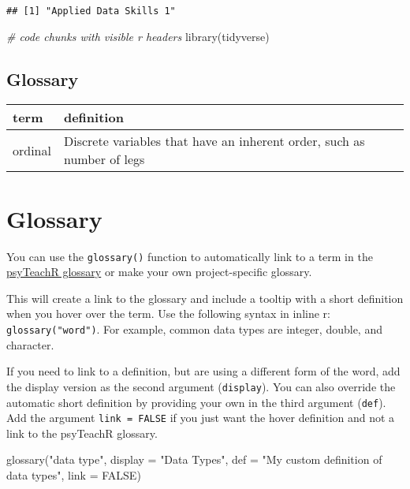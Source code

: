 \documentclass[
  oneside]{book}
\newenvironment{Shaded}{\begin{snugshade}}{\end{snugshade}}
\newcommand{\AttributeTok}[1]{\textcolor[rgb]{0.77,0.63,0.00}{#1}}
\newcommand{\CommentTok}[1]{\textcolor[rgb]{0.56,0.35,0.01}{\textit{#1}}}
\newcommand{\ConstantTok}[1]{\textcolor[rgb]{0.00,0.00,0.00}{#1}}
\newcommand{\FunctionTok}[1]{\textcolor[rgb]{0.00,0.00,0.00}{#1}}
\newcommand{\NormalTok}[1]{#1}
\newcommand{\StringTok}[1]{\textcolor[rgb]{0.31,0.60,0.02}{#1}}
\begin{document}
\begin{verbatim}
## [1] "Applied Data Skills 1"
\end{verbatim}

\begin{Shaded}
\begin{Highlighting}[]
\CommentTok{\# code chunks with visible r headers}
\FunctionTok{library}\NormalTok{(tidyverse)}
\end{Highlighting}
\end{Shaded}

\hypertarget{glossary}{%
\section{Glossary}\label{glossary}}

\begin{tabular}{l|l}
\hline
term & definition\\
\hline
ordinal & Discrete variables that have an inherent order, such as number of legs\\
\hline
\end{tabular}

\hypertarget{glossary-1}{%
\chapter{Glossary}\label{glossary-1}}

You can use the \texttt{glossary()} function to automatically link to a term in the \href{https://psyteachr.github.io/glossary/}{psyTeachR glossary} or make your own project-specific glossary.

This will create a link to the glossary and include a tooltip with a short definition when you hover over the term. Use the following syntax in inline r: \texttt{glossary("word")}. For example, common data types are integer, double, and character.

If you need to link to a definition, but are using a different form of the word, add the display version as the second argument (\texttt{display}). You can also override the automatic short definition by providing your own in the third argument (\texttt{def}). Add the argument \texttt{link\ =\ FALSE} if you just want the hover definition and not a link to the psyTeachR glossary.

\begin{Shaded}
\begin{Highlighting}[]
\FunctionTok{glossary}\NormalTok{(}\StringTok{"data type"}\NormalTok{, }
         \AttributeTok{display =} \StringTok{"Data Types"}\NormalTok{, }
         \AttributeTok{def =} \StringTok{"My custom definition of data types"}\NormalTok{, }
         \AttributeTok{link =} \ConstantTok{FALSE}\NormalTok{)}
\end{Highlighting}
\end{Shaded}
\end{document}
